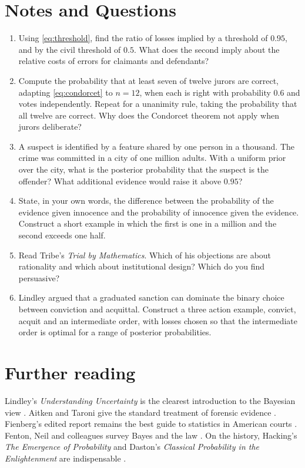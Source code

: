 \section*{Notes and Questions}
\begin{enumerate}[label=\arabic*.]
\item Using \eqref{eq:threshold}, find the ratio of losses implied by a threshold of $0.95$, and by the civil threshold of $0.5$. What does the second imply about the relative costs of errors for claimants and defendants?
\item Compute the probability that at least seven of twelve jurors are correct, adapting \eqref{eq:condorcet} to $n = 12$, when each is right with probability $0.6$ and votes independently. Repeat for a unanimity rule, taking the probability that all twelve are correct. Why does the Condorcet theorem not apply when jurors deliberate?
\item A suspect is identified by a feature shared by one person in a thousand. The crime was committed in a city of one million adults. With a uniform prior over the city, what is the posterior probability that the suspect is the offender? What additional evidence would raise it above $0.95$?
\item State, in your own words, the difference between the probability of the evidence given innocence and the probability of innocence given the evidence. Construct a short example in which the first is one in a million and the second exceeds one half.
\item Read Tribe's \emph{Trial by Mathematics}. Which of his objections are about rationality and which about institutional design? Which do you find persuasive?
\item Lindley argued that a graduated sanction can dominate the binary choice between conviction and acquittal. Construct a three action example, convict, acquit and an intermediate order, with losses chosen so that the intermediate order is optimal for a range of posterior probabilities.
\end{enumerate}

\section*{Further reading}
Lindley's \emph{Understanding Uncertainty} is the clearest introduction to the Bayesian view \citep{lindley2006}. Aitken and Taroni give the standard treatment of forensic evidence \citep{aitken_taroni2004}. Fienberg's edited report remains the best guide to statistics in American courts \citep{fienberg1989}. Fenton, Neil and colleagues survey Bayes and the law \citep{fenton2016}. On the history, Hacking's \emph{The Emergence of Probability} and Daston's \emph{Classical Probability in the Enlightenment} are indispensable \citep{hacking1975,daston1988}.
